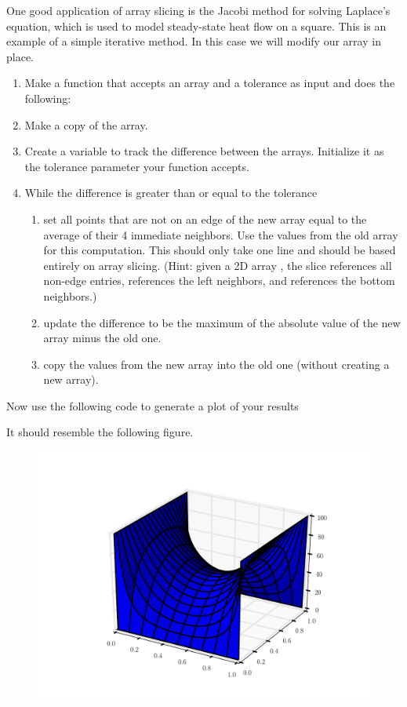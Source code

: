 \begin{problem} 
One good application of array slicing is the Jacobi
method for solving Laplace's equation, which is used to model
steady-state heat flow on a square. This is an example of a simple
iterative method. In this case we will modify our array in place. 
\begin{enumerate}
\item Make a function that accepts an array and a tolerance as input and does the
following: 
\item Make a copy of the array. 
\item Create a variable to track the difference between the arrays. Initialize
it as the tolerance parameter your function accepts. 
\item While the difference is greater than or equal
to the tolerance 
\begin{enumerate} 
\item set all points that are not on an edge of the new array equal to the average of their 4 immediate neighbors. Use the values from the old array for this computation. 
This should only take one line and should be based entirely on array slicing.
(Hint: given a 2D array , the slice  references
all non-edge entries,  references the left neighbors,
and  references the bottom neighbors.) 
\item update the difference to be the maximum of the absolute value of the new array
minus the old one. 
\item copy the values from the new array into the old
one (without creating a new array). 
\end{enumerate} 
\end{enumerate}

Now use the following code to generate a plot of your results
 
It should resemble the following figure.

\begin{figure} [H]
\includegraphics[width=.75\textwidth]{laplace.pdf}
\end{figure} 
\end{problem}

